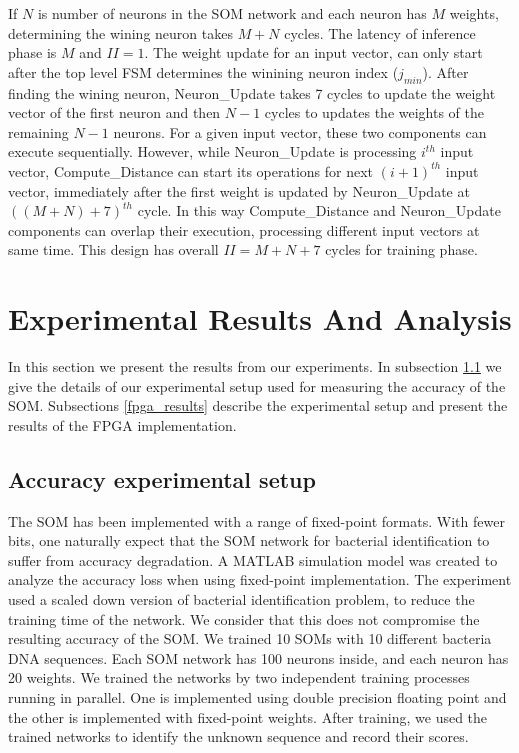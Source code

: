 If $N$ is number of neurons in the SOM network and each neuron has $M$ weights, determining the wining neuron takes $M{+}N$ cycles. The latency of inference phase is $M$ and $II{=}1$. The weight update for an input vector, can only start after the top level FSM determines the winining neuron index ($j_{min}$). After finding the wining neuron, Neuron\_Update takes 7 cycles to update the weight vector of the first neuron and then $N{-}1$ cycles to updates the weights of the remaining $N{-}1$ neurons. For a given input vector, these two components can execute sequentially. However, while Neuron\_Update is processing $i^{th}$ input vector, Compute\_Distance can start its operations for next $(i{+}1)^{th}$ input vector, immediately after the first weight is updated by Neuron\_Update at $((M{+}N){+}7)^{th}$ cycle. In this way Compute\_Distance and Neuron\_Update components can overlap their execution, processing different input vectors at same time. This design has overall $II{=}M{+}N{+}7$ cycles for training phase.

\section{Experimental Results And Analysis}\label{sec:results}
In this section we present the results from our experiments. In subsection \ref{ex_setup} we give the details of our experimental setup used for measuring the accuracy of the SOM. Subsections \ref{fpga_results} describe the experimental setup and present the results of the FPGA implementation.
\subsection{Accuracy experimental setup}\label{ex_setup}
The SOM has been implemented with a range of fixed-point formats. With fewer bits, one naturally expect that the SOM network for bacterial identification to suffer from accuracy degradation. A MATLAB simulation model was created to analyze the accuracy loss when using fixed-point implementation. The experiment used a scaled down version of bacterial identification problem, to reduce the training time of the network. We consider that this does not compromise the resulting accuracy of the SOM. We trained 10 SOMs with 10 different bacteria DNA sequences. Each SOM network has 100 neurons inside, and each neuron has 20 weights. We trained the networks by two independent training processes running in parallel. One is implemented using double precision floating point and the other is implemented with fixed-point weights. After training, we used the trained networks to identify the unknown sequence and record their scores.


